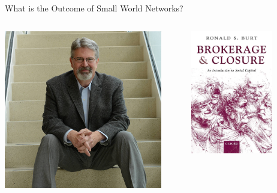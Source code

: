 \documentclass[notes, aspectratio=1610]{beamer}
\begin{document}
\begin{frame}{What is the Outcome of Small World Networks?}
	\centering
	\begin{columns}
		\begin{column}{0.5\textwidth}
			\includegraphics[width=0.9\textwidth]{images/ron_burt.jpeg}
		\end{column}
		\begin{column}{0.5\textwidth}
			\includegraphics[width=0.7\textwidth]{images/brokerage_and_closure.jpeg}
		\end{column}
	\end{columns}
\end{frame}
\end{document}
